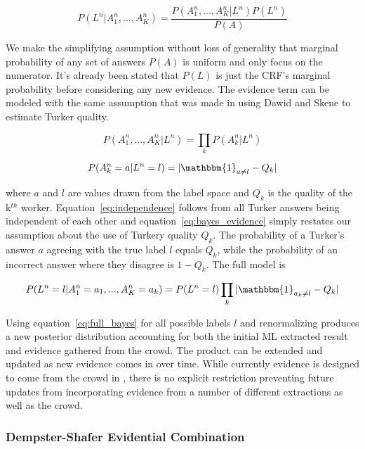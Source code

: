 \begin{equation}
P(L^{n}|A^{n}_{1},...,A^{n}_{K}) = \frac{P(A^{n}_{1},...,A^{n}_{K}|L^{n})P(L^{n})}{P(A)}
\end{equation}

We make the simplifying assumption without loss of generality that marginal probability of any set of answers $P(A)$ is uniform and only focus on the numerator.  It's already been stated that $P(L)$ is just the CRF's marginal probability before considering any new evidence.  The evidence term can be modeled with the same assumption that was made in using Dawid and Skene to estimate Turker quality.

\begin{equation}
\label{eq:independence}
P(A^{n}_{1},...,A^{n}_{K}|L^{n}) = \prod_{k}P(A^{n}_{k}|L^{n})
\end{equation}

\begin{equation}
\label{eq:bayes_evidence}
P(A^{n}_{k}=a|L^{n}=l) = |\mathbbm{1}_{{a}\neq l} - Q_{k}|
\end{equation}

where $a$ and $l$ are values drawn from the label space and $Q_{k}$ is the quality of the k$^{th}$ worker.  Equation~\ref{eq:independence} follows from all Turker answers being independent of each other and equation~\ref{eq:bayes_evidence} simply restates our assumption about the use of Turkery quality $Q_{k}$.  The probability of a Turker's answer $a$ agreeing with the true label $l$ equals $Q_{k}$, while the probability of an incorrect answer where they disagree is $1-Q_{k}$.  The full model is

\begin{equation}
\label{eq:full_bayes}
P(L^{n}=l|A^{n}_{1}=a_{1},...,A^{n}_{K}=a_{k}) = P(L^{n}=l)\prod_{k}|\mathbbm{1}_{{a_{k}}\neq l} - Q_{k}|
\end{equation}

Using equation~\ref{eq:full_bayes} for all possible labels $l$ and renormalizing produces a new posterior distribution accounting for both the initial ML extracted result and evidence gathered from the crowd.  The product can be extended and updated as new evidence comes in over time.  While currently evidence is designed to come from the crowd in \sysName , there is no explicit restriction preventing future updates from incorporating evidence from a number of different extractions as well as the crowd.

\subsubsection{Dempster-Shafer Evidential Combination}

